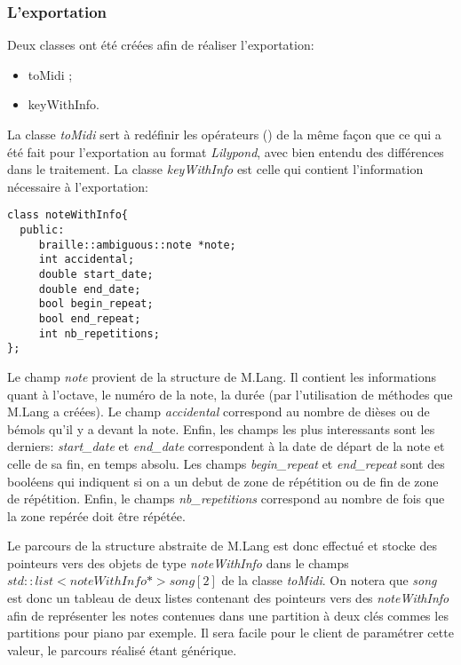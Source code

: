 \subsubsection{L'exportation}
Deux classes ont été créées afin de réaliser l'exportation:
\begin{itemize}
  \item toMidi ;
  \item keyWithInfo.
\end{itemize}

La classe \textit{toMidi} sert à redéfinir les opérateurs () de la même façon que ce qui a été fait pour l'exportation au format \textit{Lilypond}, avec bien entendu des différences dans le traitement.
La classe \textit{keyWithInfo} est celle qui contient l'information nécessaire à l'exportation:
\begin{verbatim}
class noteWithInfo{
  public:
     braille::ambiguous::note *note;
     int accidental;
     double start_date;
     double end_date;
     bool begin_repeat;
     bool end_repeat;
     int nb_repetitions;
};
\end{verbatim}
Le champ \textit{note} provient de la structure de M.Lang. Il contient les informations quant à l'octave, le numéro de la note, la durée (par l'utilisation de méthodes que M.Lang a créées). Le champ \textit{accidental} correspond au nombre de dièses ou de bémols qu'il y a devant la note.
Enfin, les champs les plus interessants sont les derniers: \textit{start\_date} et \textit{end\_date} correspondent à la date de départ de la note et celle de sa fin, en temps absolu. Les champs \textit{begin\_repeat} et \textit{end\_repeat} sont des booléens qui indiquent si on a un debut de zone de répétition ou de fin de zone de répétition. Enfin, le champs \textit{nb\_repetitions} correspond au nombre de fois que la zone repérée doit être répétée. 

Le parcours de la structure abstraite de M.Lang  est donc effectué et stocke des pointeurs vers des objets de type \textit{noteWithInfo} dans le champs $std::list<noteWithInfo*>song[2]$ de la classe \textit{toMidi}. On notera que \textit{song} est donc un tableau de deux listes contenant des pointeurs vers des \textit{noteWithInfo} afin de représenter les notes contenues dans une partition à deux clés commes les partitions pour piano par exemple. Il sera facile pour le client de paramétrer cette valeur, le parcours réalisé étant générique.

